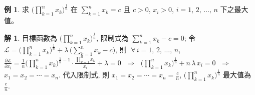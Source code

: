 \documentclass[12pt]{extarticle}
\newcommand{\ds}{\displaystyle}
\newcommand{\ie}{\;\Longrightarrow\;}
\theoremstyle{definition}
\newtheorem*{ex}{例}
\newtheorem*{sol}{解}
\begin{document}
\begin{ex}
  求 $\ds\Big(\prod_{k = 1}^n x_k\Big)^{\frac{1}{n}}$ 在 $\ds\sum_{k = 1}^n x_k = c$ 且 $c > 0$, $x_i > 0$, $i = 1,\,2,\,\ldots,\,n$ 下之最大值。 
\end{ex}

\begin{sol}
  目標函數為 $\ds\Big(\prod_{k = 1}^n x_k\Big)^{\frac{1}{n}}$, 限制式為 $\ds\sum_{k = 1}^n x_k - c = 0$; 令 $\ds\mathcal{L} = \Big(\prod_{k = 1}^n x_k\Big)^{\frac{1}{n}} + \lambda\,\Big(\sum_{k = 1}^n x_k - c\Big)$, 則 $\;\forall\,i = 1,\,2,\,\ldots,\,n$, $\ds\frac{\partial\mathcal{L}}{\partial x_i} = \frac{1}{n}\Big(\prod_{k = 1}^n x_k\Big)^{\frac{1}{n} - 1}\cdot\frac{\prod_{k = 1}^n x_k}{x_i} + \lambda = 0$ $\ie$ $\ds\Big(\prod_{k = 1}^n x_k\Big)^{\frac{1}{n}} + n\,\lambda\,x_i = 0$ $\ie$ $x_1 = x_2 = \cdots = x_n$. 代入限制式, 則 $\ds x_1 = x_2 = \cdots = x_n = \frac{c}{n}$, $\ds\Big(\prod_{k = 1}^n x_k\Big)^{\frac{1}{n}}$ 最大值為 $\ds\frac{c}{n}$. 
\end{sol}
\end{document}
